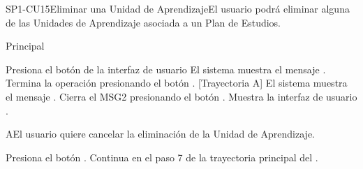 \begin{UseCase}{SP1-CU15}{Eliminar  una Unidad de Aprendizaje}{El usuario podrá eliminar alguna de las Unidades de Aprendizaje asociada a un Plan de Estudios.}
\end{UseCase}

\begin{UCtrayectoria}{Principal}

    \UCpaso[\UCactor] Presiona el botón  de la interfaz de usuario 
    \UCpaso El sistema muestra el mensaje .
    \UCpaso[\UCactor] Termina la operación presionando el botón . [Trayectoria A]
    \UCpaso El sistema muestra el mensaje .
    \UCpaso[\UCactor] Cierra el MSG2 presionando el botón .
    \UCpaso Muestra la interfaz de usuario .
\end{UCtrayectoria}


\begin{UCtrayectoriaA}{A}{El usuario quiere cancelar la eliminación de la Unidad de Aprendizaje.}

    \UCpaso[\UCactor] Presiona el botón .
    \UCpaso Continua en el paso 7 de la trayectoria principal del .

\end{UCtrayectoriaA}